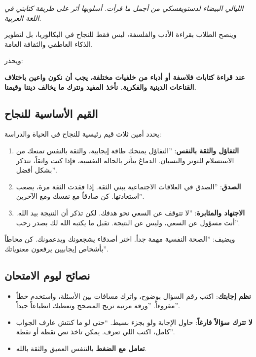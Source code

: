 \documentclass[12pt,a4paper]{book}
\newcommand{\quoteAr}[1]{%
	\begin{myquote}
		\itshape #1
	\end{myquote}
}
\newcommand{\importantAr}[1]{%
	\begin{important}
		\bfseries #1
	\end{important}
}
\begin{document}
	\quoteAr{الليالي البيضاء لدستويفسكي من أجمل ما قرأت. أسلوبها أثر على طريقة كتابتي في اللغة العربية.}
	
	وينصح الطلاب بقراءة الأدب والفلسفة، ليس فقط للنجاح في البكالوريا، بل لتطوير الذكاء العاطفي والثقافة العامة.
	
	ويحذر:
	
	\importantAr{عند قراءة كتابات فلاسفة أو أدباء من خلفيات مختلفة، يجب أن نكون واعين باختلاف القناعات الدينية والفكرية. نأخذ المفيد ونترك ما يخالف ديننا وقيمنا.}
	
	
	\subsection{القيم الأساسية للنجاح}
	
	يحدد أمين ثلاث قيم رئيسية للنجاح في الحياة والدراسة:
	
	\begin{enumerate}
		\item \textbf{التفاؤل والثقة بالنفس}: ''التفاؤل يمنحك طاقة إيجابية، والثقة بالنفس تمنعك من الاستسلام للتوتر والنسيان. الدماغ يتأثر بالحالة النفسية، فإذا كنت واثقاً، تتذكر بشكل أفضل''.
		\item \textbf{الصدق}: ''الصدق في العلاقات الاجتماعية يبني الثقة. إذا فقدت الثقة مرة، يصعب استعادتها. كن صادقاً مع نفسك ومع الآخرين''.
		\item \textbf{الاجتهاد والمثابرة}: ''لا تتوقف عن السعي نحو هدفك. لكن تذكر أن النتيجة بيد الله. أنت مسؤول عن السعي، وليس عن النتيجة. تقبل ما يكتبه الله لك بصدر رحب''.
	\end{enumerate}
	
	ويضيف: ''الصحة النفسية مهمة جداً. اختر أصدقاء يشجعونك ويدعمونك. كن محاطاً بأشخاص إيجابيين يرفعون معنوياتك''.
	
	
	\subsection{نصائح ليوم الامتحان}
	\label{sec:random-tips21}
	
	\begin{itemize}
		\item \textbf{نظم إجابتك}: اكتب رقم السؤال بوضوح، واترك مسافات بين الأسئلة، واستخدم خطاً مقروءاً. ''ورقة مرتبة تريح المصحح وتعطيك انطباعاً جيداً''.
		\item \textbf{لا تترك سؤالاً فارغاً}: حاول الإجابة ولو بجزء بسيط. ``حتى لو ما كنتش عارف الجواب كامل، اكتب اللي تعرف. يمكن تاخذ نص نقطة أو نقطة''.
		\item \textbf{تعامل مع الضغط} بالتنفس العميق والثقة بالله.
	\end{itemize}
	
\end{document}
